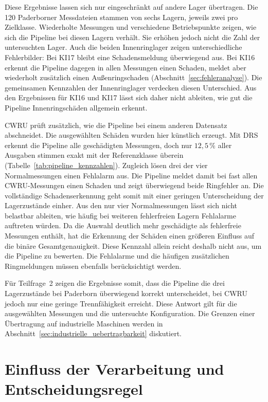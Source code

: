 Diese Ergebnisse lassen sich nur eingeschränkt auf andere Lager übertragen.
Die 120 Paderborner Messdateien stammen von sechs Lagern, jeweils zwei pro
Zielklasse. Wiederholte Messungen und verschiedene Betriebspunkte zeigen,
wie sich die Pipeline bei diesen Lagern verhält. Sie erhöhen jedoch nicht
die Zahl der untersuchten Lager. Auch die beiden Innenringlager zeigen
unterschiedliche Fehlerbilder: Bei KI17 bleibt eine Schadensmeldung
überwiegend aus. Bei KI16 erkennt die Pipeline dagegen in allen Messungen
einen Schaden, meldet aber wiederholt zusätzlich einen Außenringschaden
(Abschnitt~\ref{sec:fehleranalyse}). Die gemeinsamen Kennzahlen der
Innenringlager verdecken diesen Unterschied. Aus den Ergebnissen für KI16
und KI17 lässt sich daher nicht ableiten, wie gut die Pipeline
Innenringschäden allgemein erkennt.

CWRU prüft zusätzlich, wie die Pipeline bei einem anderen Datensatz
abschneidet. Die ausgewählten Schäden wurden hier künstlich erzeugt.
Mit DRS erkennt die Pipeline alle geschädigten Messungen, doch nur
$12{,}5\,\%$ aller Ausgaben stimmen exakt mit der Referenzklasse überein
(Tabelle~\ref{tab:pipeline_kennzahlen}). Zugleich lösen drei der vier
Normalmessungen einen Fehlalarm aus. Die Pipeline meldet damit bei fast
allen CWRU-Messungen einen Schaden und zeigt überwiegend beide Ringfehler an.
Die vollständige Schadenserkennung geht somit mit einer geringen
Unterscheidung der Lagerzustände einher.
Aus den nur vier Normalmessungen lässt sich nicht belastbar ableiten, wie häufig
bei weiteren fehlerfreien Lagern Fehlalarme auftreten würden. Da die
Auswahl deutlich mehr geschädigte als fehlerfreie Messungen enthält,
hat die Erkennung der Schäden einen größeren Einfluss auf die binäre
Gesamtgenauigkeit. Diese Kennzahl allein reicht deshalb nicht aus, um die
Pipeline zu bewerten. Die Fehlalarme und die häufigen zusätzlichen
Ringmeldungen müssen ebenfalls berücksichtigt werden.

Für Teilfrage~2 zeigen die Ergebnisse somit, dass die Pipeline die drei
Lagerzustände bei Paderborn überwiegend korrekt unterscheidet, bei CWRU
jedoch nur eine geringe Trennfähigkeit erreicht. Diese Antwort gilt für
die ausgewählten Messungen und die untersuchte Konfiguration. Die Grenzen
einer Übertragung auf industrielle Maschinen werden in
Abschnitt~\ref{sec:industrielle_uebertragbarkeit} diskutiert.

\section{Einfluss der Verarbeitung und Entscheidungsregel}
\label{sec:methodische_grenzen}


